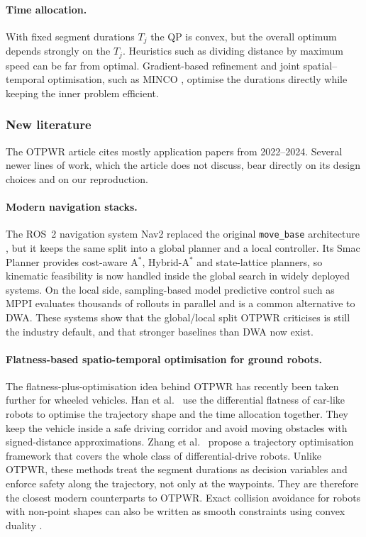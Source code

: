 \documentclass[11pt,a4paper]{article}
\begin{document}
\paragraph{Time allocation.} With fixed segment durations $T_j$ the QP is
convex, but the overall optimum depends strongly on the $T_j$. Heuristics
such as dividing distance by maximum speed can be far from optimal.
Gradient-based refinement \citep{richter2016polynomial} and joint
spatial--temporal optimisation, such as MINCO \citep{wang2022geometrically},
optimise the durations directly while keeping the inner problem efficient.

\subsubsection{New literature}
\label{sec:lit-new}

The OTPWR article cites mostly application papers from 2022--2024. Several
newer lines of work, which the article does not discuss, bear directly on
its design choices and on our reproduction.

\paragraph{Modern navigation stacks.} The ROS~2 navigation system Nav2
\citep{macenski2020marathon} replaced the original \texttt{move\_base}
architecture \citep{marder2010office}, but it keeps the same split into a
global planner and a local controller. Its Smac Planner
\citep{macenski2024smac} provides cost-aware A$^\ast$, Hybrid-A$^\ast$ and
state-lattice planners, so kinematic feasibility is now handled inside the
global search in widely deployed systems. On the local side, sampling-based
model predictive control such as MPPI \citep{williams2017mppi} evaluates
thousands of rollouts in parallel and is a common alternative to DWA. These
systems show that the global/local split OTPWR criticises is still the
industry default, and that stronger baselines than DWA now exist.

\paragraph{Flatness-based spatio-temporal optimisation for ground robots.}
The flatness-plus-optimisation idea behind OTPWR has recently been taken
further for wheeled vehicles. Han et al.\ \citep{han2024efficient} use the
differential flatness of car-like robots to optimise the trajectory shape and
the time allocation together. They keep the vehicle inside a safe driving
corridor and avoid moving obstacles with signed-distance approximations.
Zhang et al.\ \citep{zhang2024universal} propose a trajectory optimisation
framework that covers the whole class of differential-drive robots. Unlike
OTPWR, these methods treat the segment durations as decision variables and
enforce safety along the trajectory, not only at the waypoints. They are
therefore the closest modern counterparts to OTPWR. Exact collision avoidance
for robots with non-point shapes can also be written as smooth constraints
using convex duality \citep{zhang2021obca}.
\end{document}
